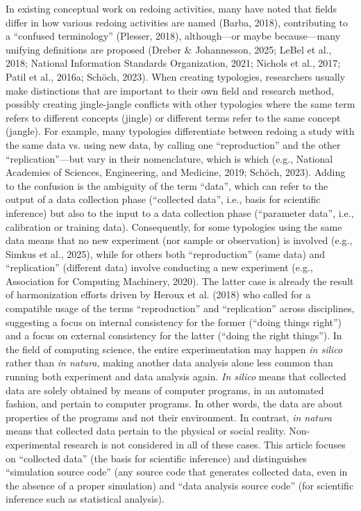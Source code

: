 \documentclass[authordate, empirical]{jote-new-article}
\begin{document}
	In existing conceptual work on redoing activities, many have noted that fields differ in how various redoing activities are named (Barba, 2018), contributing to a “confused terminology” (Plesser, 2018), although—or maybe because—many unifying definitions are proposed (Dreber \& Johannesson, 2025; LeBel et al., 2018; National Information Standards Organization, 2021; Nichols et al., 2017; Patil et al., 2016a; Schöch, 2023). When creating typologies, researchers usually make distinctions that are important to their own field and research method, possibly creating jingle-jangle conflicts with other typologies where the same term refers to different concepts (jingle) or different terms refer to the same concept (jangle). For example, many typologies differentiate between redoing a study with the same data vs. using new data, by calling one “reproduction” and the other “replication”—but vary in their nomenclature, which is which (e.g., National Academies of Sciences, Engineering, and Medicine, 2019; Schöch, 2023). Adding to the confusion is the ambiguity of the term “data”, which can refer to the output of a data collection phase (“collected data”, i.e., basis for scientific inference) but also to the input to a data collection phase (“parameter data”, i.e., calibration or training data). Consequently, for some typologies using the same data means that no new experiment (nor sample or observation) is involved (e.g., Simkus et al., 2025), while for others both “reproduction” (same data) and “replication” (different data) involve conducting a new experiment (e.g., Association for Computing Machinery, 2020). The latter case is already the result of harmonization efforts driven by Heroux et al. (2018) who called for a compatible usage of the terms “reproduction” and “replication” across disciplines, suggesting a focus on internal consistency for the former (“doing things right”) and a focus on external consistency for the latter (“doing the right things”). In the field of computing science, the entire experimentation may happen \emph{in silico} rather than \emph{in natura}, making another data analysis alone less common than running both experiment and data analysis again. \emph{In silico} means that collected data are solely obtained by means of computer programs, in an automated fashion, and pertain to computer programs. In other words, the data are about properties of the programs and not their environment. In contrast, \emph{in natura} means that collected data pertain to the physical or social reality. Non-experimental research is not considered in all of these cases. This article focuses on “collected data” (the basis for scientific inference) and distinguishes “simulation source code” (any source code that generates collected data, even in the absence of a proper simulation) and “data analysis source code” (for scientific inference such as statistical analysis).
\end{document}

